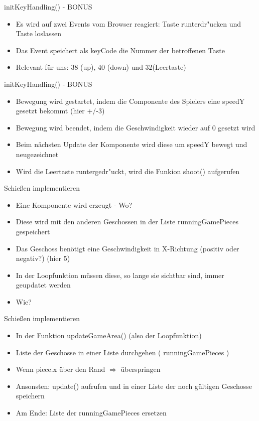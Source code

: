 \documentclass[18pt]{beamer}
\begin{document}
\begin{frame}{ \glqq initKeyHandling()\grqq{} - BONUS}
\begin{itemize}
	\item Es wird auf zwei Events vom Browser reagiert: Taste runterdr"ucken und Taste loslassen
	\item Das Event speichert als \glqq keyCode\grqq{} die Nummer der betroffenen Taste
	\item Relevant für uns: 38 (up), 40 (down) und 32(Leertaste)
	
\end{itemize}
\end{frame}

\begin{frame}{ \glqq initKeyHandling()\grqq{} - BONUS}
\begin{itemize}
	\item Bewegung wird gestartet, indem die Componente des Spielers eine  \glqq speedY\grqq{} gesetzt bekommt (hier +/-3)
	\item Bewegung wird beendet, indem die Geschwindigkeit wieder auf 0 gesetzt wird
	\item Beim nächsten Update der Komponente wird diese um speedY bewegt und neugezeichnet
	\item Wird die Leertaste runtergedr"uckt, wird die Funkion  \glqq shoot()\grqq{} aufgerufen
\end{itemize}
\end{frame}

\begin{frame}{Schießen implementieren}
\begin{itemize}
	\item Eine Komponente wird erzeugt - Wo? 
	\item Diese wird mit den anderen Geschossen in der Liste runningGamePieces gespeichert
	\item Das Geschoss benötigt eine Geschwindigkeit in X-Richtung (positiv oder negativ?) (hier 5)
	\item In der Loopfunktion müssen diese, so lange sie sichtbar sind, immer geupdatet werden
	\item Wie?
\end{itemize}
\end{frame}

\begin{frame}[fragile]{Schießen implementieren}
\begin{itemize}
	\item In der Funktion \glqq updateGameArea()\grqq{} (also der Loopfunktion)
	\item Liste der Geschosse in einer Liste durchgehen ( \glqq  runningGamePieces \grqq{})
	\item Wenn \glqq piece.x\grqq{} über den Rand $\Rightarrow$ überspringen
	\item Ansonsten: \glqq update()\grqq{} aufrufen und in einer Liste der noch gültigen Geschosse speichern
	\item Am Ende: Liste der \glqq runningGamePieces\grqq{} ersetzen
\end{itemize}
\end{frame}
\end{document}
